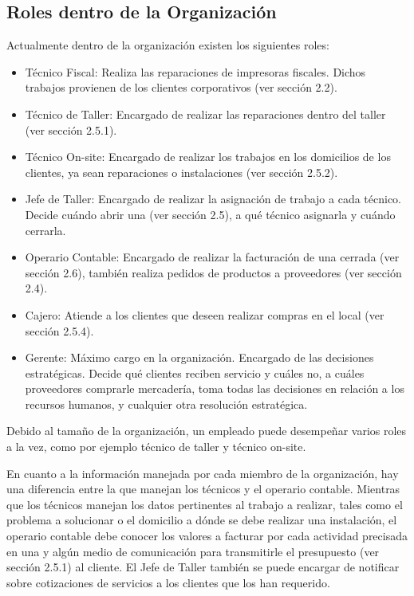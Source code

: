 \documentclass[12pt]{extarticle}
\begin{document}
\begin{spacing}{1.2}
    \subsection{Roles dentro de la Organización}
    Actualmente dentro de la organización existen los siguientes roles:
    \begin{itemize}
        \item Técnico Fiscal: Realiza las reparaciones de impresoras fiscales. Dichos trabajos provienen de los clientes corporativos (ver sección 2.2).
        \item Técnico de Taller: Encargado de realizar las reparaciones dentro del taller (ver sección 2.5.1). 
        \item Técnico On-site: Encargado de realizar los trabajos en los domicilios de los clientes, ya sean reparaciones o instalaciones (ver sección 2.5.2).
        \item Jefe de Taller: Encargado de realizar la asignación de trabajo a cada técnico. Decide cuándo abrir una \OT{} (ver sección 2.5), a qué técnico asignarla y cuándo cerrarla.
        \item Operario Contable: Encargado de realizar la facturación de una \OT{} cerrada (ver sección 2.6), también realiza pedidos de productos a proveedores (ver sección 2.4).
        \item Cajero: Atiende a los clientes que deseen realizar compras en el local (ver sección 2.5.4).
        \item Gerente: Máximo cargo en la organización. Encargado de las decisiones estratégicas. Decide qué clientes reciben servicio y cuáles no, a cuáles proveedores comprarle mercadería, toma todas las decisiones en relación a los recursos humanos, y cualquier otra resolución estratégica.  
    \end{itemize}
    

    Debido al tamaño de la organización, un empleado puede desempeñar varios roles a la vez, como por ejemplo técnico de taller y técnico on-site.  

    En cuanto a la información manejada por cada miembro de la organización, hay una diferencia entre la que manejan los técnicos y el operario contable. Mientras que los técnicos manejan los datos pertinentes al trabajo a realizar, tales como el problema a solucionar o el domicilio a dónde se debe realizar una instalación, el operario contable debe conocer los valores a facturar por cada actividad precisada en una \OT{} y algún medio de comunicación para transmitirle el presupuesto (ver sección 2.5.1) al cliente. El Jefe de Taller también se puede encargar de notificar sobre cotizaciones de servicios a los clientes que los han requerido.


\end{spacing}
\end{document}
